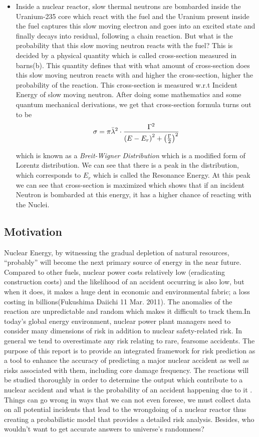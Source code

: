 \documentclass{article}
\begin{document}
\begin{itemize}
\item
  Inside a nuclear reactor, slow thermal neutrons are bombarded inside the Uranium-235 core which react with the fuel and the Uranium present inside the fuel captures this slow moving electron and goes into an excited state and finally decays into residual, following a chain reaction. But what is the probability that this slow moving neutron reacts with the fuel? This is decided by a physical quantity which is called cross-section measured in barns(b). This quantity defines that with what amount of cross-section does this slow moving neutron reacts with and higher the cross-section, higher the probability of the reaction. This cross-section is measured w.r.t Incident Energy of slow moving neutron. After doing some mathematics and some quantum mechanical derivations, we get that cross-section formula turns out to be \[\sigma = \pi \Bar{\lambda}^2\cdot\frac{\Gamma^2}{\left(E - E_{r}\right)^2 + \left(\frac{\Gamma}{2}\right)^2}\]

  which is known as a \textit{Breit-Wigner Distribution} which is a modified form of Lorentz distribution. We can see that there is a peak in the distribution, which corresponds to $E_r$ which is called the Resonance Energy. At this peak we can see that cross-section is maximized which shows that if an incident Neutron is bombarded at this energy, it has a higher chance of reacting with the Nuclei.
\end{itemize}

\subsection{Motivation}
Nuclear Energy, by witnessing the gradual depletion of natural resources, ``probably'' will become the next primary source of energy in the near future.
Compared to other fuels, nuclear power costs relatively low (eradicating construction costs) and the likelihood of an accident occurring is also low, but when it does, it makes a huge dent in economic and environmental fabric; a loss costing in billions(Fukushima Daiichi 11 Mar. 2011). The anomalies of the reaction are unpredictable and random which makes it difficult to track them.In today’s global energy environment, nuclear power plant managers need to consider many dimensions of risk in addition to nuclear safety-related risk.  In general we tend to overestimate any risk relating to rare, fearsome accidents. The purpose of this report is to provide an integrated framework for risk prediction as a tool to enhance the accuracy of predicting a major nuclear accident as well as risks associated with them, including core damage frequency. The reactions will be studied thoroughly in order to determine the output which contribute to a nuclear accident and what is the probability of an accident happening due to it . Things can go wrong in ways that we can not even foresee, we must collect data on all potential incidents that lead to the wrongdoing of a nuclear reactor thus creating a probabilistic model that provides a detailed risk analysis. Besides, who wouldn't want to get accurate answers to  universe's randomness?
\end{document}
